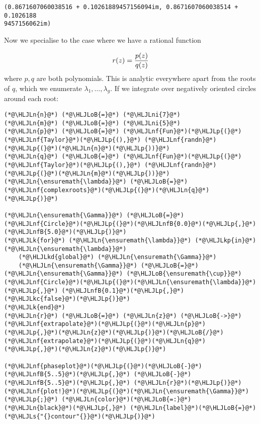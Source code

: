 \documentclass[12pt,a4paper]{article}
\newcommand{\HLJLk}[1]{\textcolor[RGB]{148,91,176}{\textbf{#1}}}
\newcommand{\HLJLkc}[1]{\textcolor[RGB]{59,151,46}{\textit{#1}}}
\newcommand{\HLJLkd}[1]{\textcolor[RGB]{214,102,97}{\textit{#1}}}
\newcommand{\HLJLkp}[1]{\textcolor[RGB]{148,91,176}{\textbf{#1}}}
\newcommand{\HLJLn}[1]{#1}
\newcommand{\HLJLnf}[1]{\textcolor[RGB]{66,102,213}{#1}}
\newcommand{\HLJLs}[1]{\textcolor[RGB]{201,61,57}{#1}}
\newcommand{\HLJLnfB}[1]{\textcolor[RGB]{59,151,46}{#1}}
\newcommand{\HLJLni}[1]{\textcolor[RGB]{59,151,46}{#1}}
\newcommand{\HLJLoB}[1]{\textcolor[RGB]{102,102,102}{\textbf{#1}}}
\newcommand{\HLJLp}[1]{#1}
\begin{document}
\begin{lstlisting}
(0.8671607060038516 + 0.10261889457156094im, 0.8671607060038514 + 0.1026188
9457156062im)
\end{lstlisting}


Now we specialise to the case where we have a rational function

\[
r(z) = {p(z) \over q(z)}
\]
where $p,q$ are both polynomials. This is analytic everywhere apart from the roots of $q$, which we enumerate $\lambda_1,\ldots,\lambda_g$.   If we integrate over negatively oriented circles around each root:


\begin{lstlisting}
(*@\HLJLn{n}@*) (*@\HLJLoB{=}@*) (*@\HLJLni{7}@*)
(*@\HLJLn{m}@*) (*@\HLJLoB{=}@*) (*@\HLJLni{5}@*)
(*@\HLJLn{p}@*) (*@\HLJLoB{=}@*) (*@\HLJLnf{Fun}@*)(*@\HLJLp{(}@*)(*@\HLJLnf{Taylor}@*)(*@\HLJLp{(),}@*) (*@\HLJLnf{randn}@*)(*@\HLJLp{(}@*)(*@\HLJLn{n}@*)(*@\HLJLp{))}@*)
(*@\HLJLn{q}@*) (*@\HLJLoB{=}@*) (*@\HLJLnf{Fun}@*)(*@\HLJLp{(}@*)(*@\HLJLnf{Taylor}@*)(*@\HLJLp{(),}@*) (*@\HLJLnf{randn}@*)(*@\HLJLp{(}@*)(*@\HLJLn{m}@*)(*@\HLJLp{))}@*)
(*@\HLJLn{\ensuremath{\lambda}}@*) (*@\HLJLoB{=}@*) (*@\HLJLnf{complexroots}@*)(*@\HLJLp{(}@*)(*@\HLJLn{q}@*)(*@\HLJLp{)}@*)

(*@\HLJLn{\ensuremath{\Gamma}}@*) (*@\HLJLoB{=}@*) (*@\HLJLnf{Circle}@*)(*@\HLJLp{(}@*)(*@\HLJLnfB{0.0}@*)(*@\HLJLp{,}@*) (*@\HLJLnfB{5.0}@*)(*@\HLJLp{)}@*)
(*@\HLJLk{for}@*) (*@\HLJLn{\ensuremath{\lambda}}@*) (*@\HLJLkp{in}@*) (*@\HLJLn{\ensuremath{\lambda}}@*)
    (*@\HLJLkd{global}@*) (*@\HLJLn{\ensuremath{\Gamma}}@*)
    (*@\HLJLn{\ensuremath{\Gamma}}@*) (*@\HLJLoB{=}@*) (*@\HLJLn{\ensuremath{\Gamma}}@*) (*@\HLJLoB{\ensuremath{\cup}}@*) (*@\HLJLnf{Circle}@*)(*@\HLJLp{(}@*)(*@\HLJLn{\ensuremath{\lambda}}@*)(*@\HLJLp{,}@*) (*@\HLJLnfB{0.1}@*)(*@\HLJLp{,}@*) (*@\HLJLkc{false}@*)(*@\HLJLp{)}@*)
(*@\HLJLk{end}@*)
(*@\HLJLn{r}@*) (*@\HLJLoB{=}@*) (*@\HLJLn{z}@*) (*@\HLJLoB{->}@*) (*@\HLJLnf{extrapolate}@*)(*@\HLJLp{(}@*)(*@\HLJLn{p}@*)(*@\HLJLp{,}@*)(*@\HLJLn{z}@*)(*@\HLJLp{)}@*)(*@\HLJLoB{/}@*)(*@\HLJLnf{extrapolate}@*)(*@\HLJLp{(}@*)(*@\HLJLn{q}@*)(*@\HLJLp{,}@*)(*@\HLJLn{z}@*)(*@\HLJLp{)}@*)

(*@\HLJLnf{phaseplot}@*)(*@\HLJLp{(}@*)(*@\HLJLoB{-}@*)(*@\HLJLnfB{5..5}@*)(*@\HLJLp{,}@*) (*@\HLJLoB{-}@*)(*@\HLJLnfB{5..5}@*)(*@\HLJLp{,}@*) (*@\HLJLn{r}@*)(*@\HLJLp{)}@*)
(*@\HLJLnf{plot!}@*)(*@\HLJLp{(}@*)(*@\HLJLn{\ensuremath{\Gamma}}@*)(*@\HLJLp{;}@*) (*@\HLJLn{color}@*)(*@\HLJLoB{=:}@*)(*@\HLJLn{black}@*)(*@\HLJLp{,}@*) (*@\HLJLn{label}@*)(*@\HLJLoB{=}@*)(*@\HLJLs{"{}contour"{}}@*)(*@\HLJLp{)}@*)
\end{lstlisting}
\end{document}
